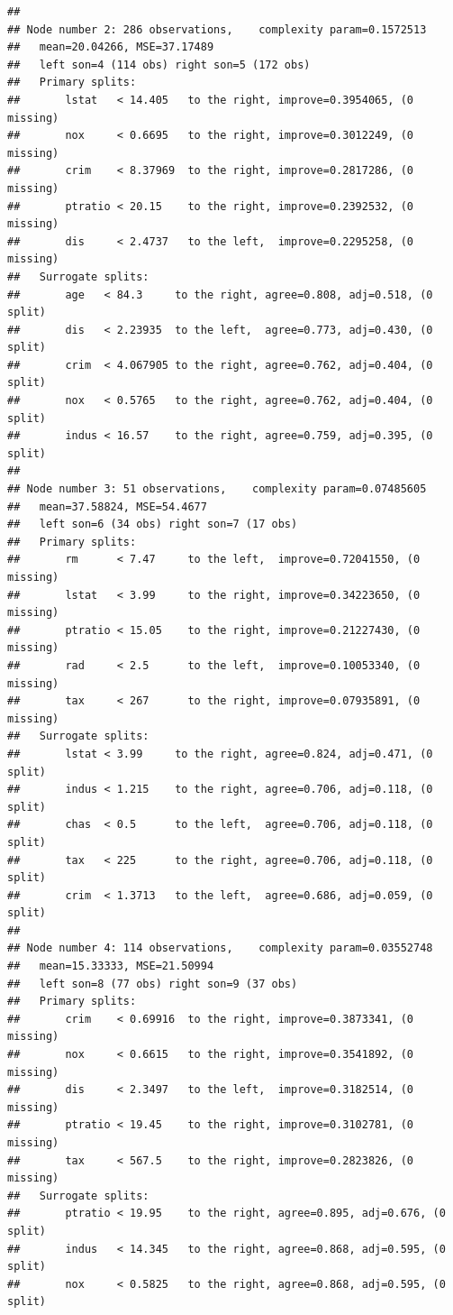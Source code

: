 \documentclass[
]{book}
\theoremstyle{plain}
\theoremstyle{definition}
\theoremstyle{definition}
\theoremstyle{definition}
\theoremstyle{definition}
\theoremstyle{definition}
\theoremstyle{remark}
\begin{document}
\begin{verbatim}
## 
## Node number 2: 286 observations,    complexity param=0.1572513
##   mean=20.04266, MSE=37.17489 
##   left son=4 (114 obs) right son=5 (172 obs)
##   Primary splits:
##       lstat   < 14.405   to the right, improve=0.3954065, (0 missing)
##       nox     < 0.6695   to the right, improve=0.3012249, (0 missing)
##       crim    < 8.37969  to the right, improve=0.2817286, (0 missing)
##       ptratio < 20.15    to the right, improve=0.2392532, (0 missing)
##       dis     < 2.4737   to the left,  improve=0.2295258, (0 missing)
##   Surrogate splits:
##       age   < 84.3     to the right, agree=0.808, adj=0.518, (0 split)
##       dis   < 2.23935  to the left,  agree=0.773, adj=0.430, (0 split)
##       crim  < 4.067905 to the right, agree=0.762, adj=0.404, (0 split)
##       nox   < 0.5765   to the right, agree=0.762, adj=0.404, (0 split)
##       indus < 16.57    to the right, agree=0.759, adj=0.395, (0 split)
## 
## Node number 3: 51 observations,    complexity param=0.07485605
##   mean=37.58824, MSE=54.4677 
##   left son=6 (34 obs) right son=7 (17 obs)
##   Primary splits:
##       rm      < 7.47     to the left,  improve=0.72041550, (0 missing)
##       lstat   < 3.99     to the right, improve=0.34223650, (0 missing)
##       ptratio < 15.05    to the right, improve=0.21227430, (0 missing)
##       rad     < 2.5      to the left,  improve=0.10053340, (0 missing)
##       tax     < 267      to the right, improve=0.07935891, (0 missing)
##   Surrogate splits:
##       lstat < 3.99     to the right, agree=0.824, adj=0.471, (0 split)
##       indus < 1.215    to the right, agree=0.706, adj=0.118, (0 split)
##       chas  < 0.5      to the left,  agree=0.706, adj=0.118, (0 split)
##       tax   < 225      to the right, agree=0.706, adj=0.118, (0 split)
##       crim  < 1.3713   to the left,  agree=0.686, adj=0.059, (0 split)
## 
## Node number 4: 114 observations,    complexity param=0.03552748
##   mean=15.33333, MSE=21.50994 
##   left son=8 (77 obs) right son=9 (37 obs)
##   Primary splits:
##       crim    < 0.69916  to the right, improve=0.3873341, (0 missing)
##       nox     < 0.6615   to the right, improve=0.3541892, (0 missing)
##       dis     < 2.3497   to the left,  improve=0.3182514, (0 missing)
##       ptratio < 19.45    to the right, improve=0.3102781, (0 missing)
##       tax     < 567.5    to the right, improve=0.2823826, (0 missing)
##   Surrogate splits:
##       ptratio < 19.95    to the right, agree=0.895, adj=0.676, (0 split)
##       indus   < 14.345   to the right, agree=0.868, adj=0.595, (0 split)
##       nox     < 0.5825   to the right, agree=0.868, adj=0.595, (0 split)

\end{verbatim}
\end{document}
